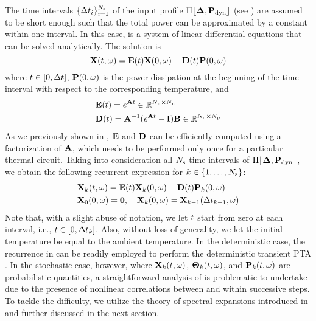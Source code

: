 The time intervals $\{ \Delta t_i \}_{i = 1}^{N_\text{s}}$ of the input profile $\profPdyn$ (see ) are assumed to be short enough such that the total power can be approximated by a constant within one interval. In this case,  is a system of linear differential equations that can be solved analytically. The solution is
\begin{equation} \elabel{ode-solution}
  \vX(\t, \o) = \mE(\t) \vX(0, \o) + \mD(\t) \vP(0, \o)
\end{equation}
where $t \in [0, \Delta t]$, $\mathbf{P}(0, \omega)$ is the power dissipation at the beginning of the time interval with respect to the corresponding temperature, and
\begin{align*}
  & \mE(\t) = e^{\mA \t} \in \real^{\nodes \times \nodes} \\
  & \mD(\t) = \mA^{-1} (e^{\mA \t} - \mI) \mB \in \real^{\nodes \times \cores}
\end{align*}
As we previously shown in \cite{ukhov2012}, $\mE$ and $\mD$ can be efficiently computed using a factorization of $\mA$, which needs to be performed only once for a particular thermal circuit. Taking into consideration all $N_\text{s}$ time intervals of $\profPdyn$, we obtain the following recurrent expression for $k \in \{ 1, \dotsc, N_\text{s} \}$:
\begin{align}
  & \vX_k(\t, \o) = \mE(\t) \vX_k(0, \o) + \mD(\t) \vP_k(0, \o) \elabel{recurrence} \\
  & \vX_0(0, \o) = \vZero, \hspace{1em} \vX_k(0, \o) = \vX_{k - 1}(\dt_{k - 1}, \o) \nonumber
\end{align}
Note that, with a slight abuse of notation, we let $t$ start from zero at each interval, i.e., $t \in [ 0, \Delta t_k ]$. Also, without loss of generality, we let the initial temperature be equal to the ambient temperature. In the deterministic case, the recurrence in  can be readily employed to perform the deterministic transient PTA \cite{ukhov2012}. In the stochastic case, however, where $\mathbf{X}_k(t, \omega)$, ${\boldsymbol\Theta}_k(t, \omega)$, and $\mathbf{P}_k(t, \omega)$ are probabilistic quantities, a straightforward analysis of  is problematic to undertake due to the presence of nonlinear correlations between and within successive steps. To tackle the difficulty, we utilize the theory of spectral expansions introduced in  and further discussed in the next section.
